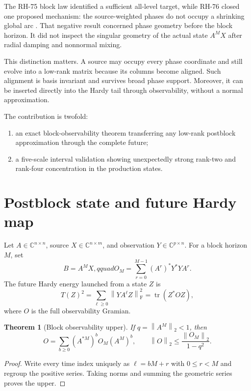 \documentclass[11pt]{article}
\newtheorem{theorem}{Theorem}[section]
\newcommand{\norm}[1]{\left\lVert#1\right\rVert}
\newcommand{\F}{\mathrm F}
\begin{document}
The RH-75 block law identified a sufficient all-level target, while RH-76
closed one proposed mechanism: the source-weighted phases do not occupy a
shrinking global arc \citep{WangPhase2026}.  That negative result concerned
phase geometry before the block horizon.  It did not inspect the singular
geometry of the actual state $A^MX$ after radial damping and nonnormal mixing.

This distinction matters.  A source may occupy every phase coordinate and
still evolve into a low-rank matrix because its columns become aligned.  Such
alignment is basis invariant and survives broad phase support.  Moreover, it
can be inserted directly into the Hardy tail through observability, without a
normal approximation.

The contribution is twofold:
\begin{enumerate}[leftmargin=2.2em]
 \item an exact block-observability theorem transferring any low-rank
       postblock approximation through the complete future;
 \item a five-scale interval validation showing unexpectedly strong rank-two
       and rank-four concentration in the production states.
\end{enumerate}

\section{Postblock state and future Hardy map}

Let $A\in\mathbb C^{n\times n}$, source
$X\in\mathbb C^{n\times m}$, and observation
$Y\in\mathbb C^{p\times n}$.  For a block horizon $M$, set
\[
 B=A^MX,qquad
 O_M=\sum_{r=0}^{M-1}(A^r)^*Y^*YA^r.
\]
The future Hardy energy launched from a state $Z$ is
\begin{equation}
 T(Z)^2=\sum_{\ell\ge0}\norm{YA^\ell Z}_{\F}^2
 =\operatorname{tr}(Z^*OZ),
 \label{eq:future}
\end{equation}
where $O$ is the full observability Gramian.

\begin{theorem}[Block observability upper]
\label{thm:observability}
If $q=\norm{A^M}_2<1$, then
\begin{equation}
 O=\sum_{b\ge0}(A^{*M})^b O_M(A^M)^b,
 \qquad
 \norm O_2\le\frac{\norm{O_M}_2}{1-q^2}.
 \label{eq:obs-upper}
\end{equation}
\end{theorem}

\begin{proof}
Write every time index uniquely as $\ell=bM+r$ with $0\le r<M$ and regroup
the positive series.  Taking norms and summing the geometric series proves the
upper.
\end{proof}
\end{document}
